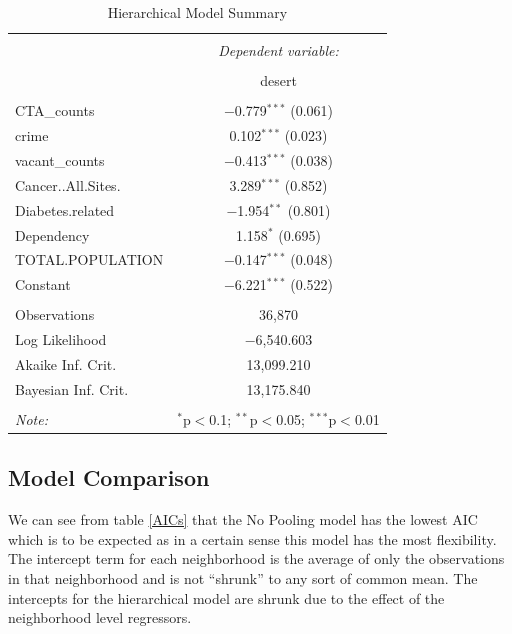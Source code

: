 \documentclass{report}
\begin{document}
\begin{table}[!htbp] \centering 
  \caption{Hierarchical Model Summary} 
  \label{mlm} 
\begin{tabular}{@{\extracolsep{5pt}}lc} 
\\[-1.8ex]\hline 
\hline \\[-1.8ex] 
 & \multicolumn{1}{c}{\textit{Dependent variable:}} \\ 
\cline{2-2} 
\\[-1.8ex] & desert \\ 
\hline \\[-1.8ex] 
 CTA\_counts & $-$0.779$^{***}$ (0.061) \\ 
 crime & 0.102$^{***}$ (0.023) \\ 
 vacant\_counts & $-$0.413$^{***}$ (0.038) \\ 
 Cancer..All.Sites. & 3.289$^{***}$ (0.852) \\ 
 Diabetes.related & $-$1.954$^{**}$ (0.801) \\ 
 Dependency & 1.158$^{*}$ (0.695) \\ 
 TOTAL.POPULATION & $-$0.147$^{***}$ (0.048) \\ 
 Constant & $-$6.221$^{***}$ (0.522) \\ 
\hline \\[-1.8ex] 
Observations & 36,870 \\ 
Log Likelihood & $-$6,540.603 \\ 
Akaike Inf. Crit. & 13,099.210 \\ 
Bayesian Inf. Crit. & 13,175.840 \\ 
\hline 
\hline \\[-1.8ex] 
\textit{Note:}  & \multicolumn{1}{r}{$^{*}$p$<$0.1; $^{**}$p$<$0.05; $^{***}$p$<$0.01} \\ 
\end{tabular} 
\end{table} 

\subsection*{Model Comparison}

We can see from table \ref{AICs} that the No Pooling model has the lowest AIC which is to be expected as in a certain sense this model has the most flexibility. The intercept term for each neighborhood is the average of only the observations in that neighborhood and is not ``shrunk'' to any sort of common mean. The intercepts for the hierarchical model are shrunk due to the effect of the neighborhood level regressors. 
\end{document}
